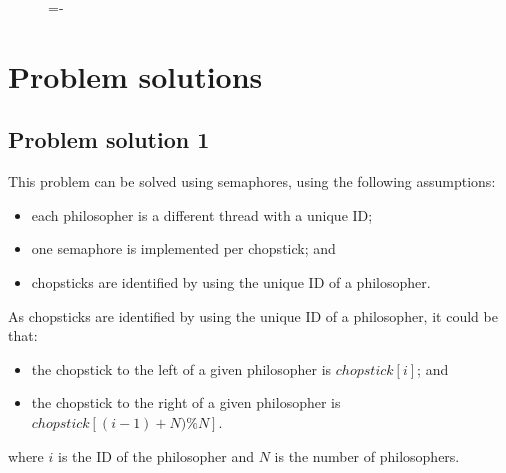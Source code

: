 \documentclass[a4paper]{systems-software}
\begin{document}
\begin{figure}[H]
  \lineskip=-\fboxrule
\end{figure}


\section*{Problem solutions}

\subsection*{Problem solution 1}

This problem can be solved using semaphores, using the following assumptions:
\begin{itemize}
	\item each philosopher is a different thread with a unique ID;
	\item one semaphore is implemented per chopstick; and
	\item chopsticks are identified by using the unique ID of a philosopher.
\end{itemize}

As chopsticks are identified by using the unique ID of a philosopher, it could be that:
\begin{itemize}
	\item the chopstick to the left of a given philosopher is $chopstick[i]$; and
	\item the chopstick to the right of a given philosopher is $chopstick[(i-1) + N) \% N].$
\end{itemize}
where $i$ is the ID of the philosopher and $N$ is the number of philosophers.
\end{document}

